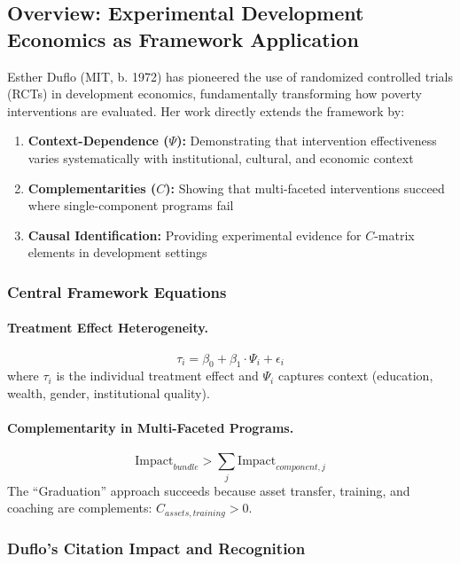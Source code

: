 \documentclass[12pt,a4paper]{article}
\begin{document}
\subsection{Overview: Experimental Development Economics as Framework Application}

Esther Duflo (MIT, b. 1972) has pioneered the use of randomized controlled trials (RCTs)
in development economics, fundamentally transforming how poverty interventions are
evaluated. Her work directly extends the framework by:
\begin{enumerate}
  \item \textbf{Context-Dependence ($\Psi$):} Demonstrating that intervention effectiveness varies
        systematically with institutional, cultural, and economic context
  \item \textbf{Complementarities ($C$):} Showing that multi-faceted interventions succeed where
        single-component programs fail
  \item \textbf{Causal Identification:} Providing experimental evidence for $C$-matrix elements in
        development settings
\end{enumerate}

\subsubsection{Central Framework Equations}

\paragraph{Treatment Effect Heterogeneity.}
\begin{equation}
  \tau_i = \beta_0 + \beta_1 \cdot \Psi_i + \epsilon_i
\end{equation}
where $\tau_i$ is the individual treatment effect and $\Psi_i$ captures context (education, wealth,
gender, institutional quality).

\paragraph{Complementarity in Multi-Faceted Programs.}
\begin{equation}
  \text{Impact}_{bundle} > \sum_j \text{Impact}_{component,j}
\end{equation}
The ``Graduation'' approach succeeds because asset transfer, training, and coaching
are complements: $C_{assets,training} > 0$.

\subsubsection{Duflo's Citation Impact and Recognition}
\end{document}
